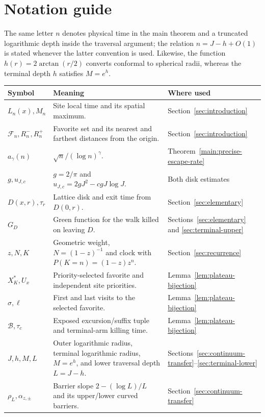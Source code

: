 \clearpage
\appendix
\section{Notation guide}\label{sec:notation}

The same letter $n$ denotes physical time in the main theorem and a
truncated logarithmic depth inside the traversal argument; the relation
$n=J-h+O(1)$ is stated whenever the latter convention is used. Likewise,
the function $h(r)=2\arctan(r/2)$ converts conformal to spherical radii,
whereas the terminal depth $h$ satisfies $M=e^h$.

\small
\begin{longtable}{@{}p{}p{}p{}@{}}
\toprule
Symbol & Meaning & Where used \\
\midrule
\endhead
$L_n(x),M_n$ & Site local time and its spatial maximum. & Section~\ref{sec:introduction} \\
$\mathcal F_n,R_n^-,R_n^+$ & Favorite set and its nearest and farthest distances from the origin. & Section~\ref{sec:introduction} \\
$a_\gamma(n)$ & $\sqrt n/(\log n)^\gamma$. & Theorem~\ref{main:precise-escape-rate} \\
$g,u_{J,c}$ & $g=2/\pi$ and $u_{J,c}=2gJ^2-cgJ\log J$. & Both disk estimates \\
$D(x,r),\tau_r$ & Lattice disk and exit time from $D(0,r)$. & Section~\ref{sec:elementary} \\
$G_D$ & Green function for the walk killed on leaving $D$. & Sections~\ref{sec:elementary} and \ref{sec:terminal-upper} \\
$z,N,K$ & Geometric weight, $N=(1-z)^{-1}$ and clock with $P(K=n)=(1-z)z^n$. & Section~\ref{sec:recurrence} \\
$X_K^*,U_x$ & Priority-selected favorite and independent site priorities. & Lemma~\ref{lem:plateau-bijection} \\
$\sigma,\ell$ & First and last visits to the selected favorite. & Lemma~\ref{lem:plateau-bijection} \\
$\mathcal B,\tau_c$ & Exposed excursion/suffix tuple and terminal-arm killing time. & Lemma~\ref{lem:plateau-bijection} \\
$J,h,M,L$ & Outer logarithmic radius, terminal logarithmic radius, $M=e^h$, and lower traversal depth $L=J-h$. & Sections~\ref{sec:continuum-transfer}--\ref{sec:terminal-lower} \\
$\rho_L,\alpha_{z,\pm}$ & Barrier slope $2-(\log L)/L$ and its upper/lower curved barriers. & Section~\ref{sec:continuum-transfer} \\

\end{longtable}
